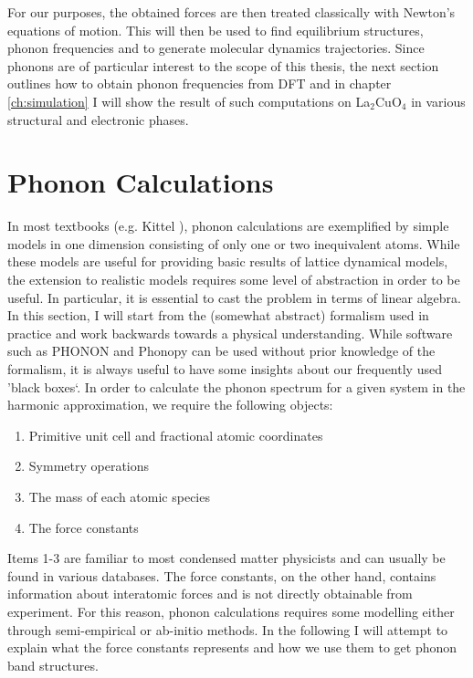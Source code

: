 For our purposes, the obtained forces are then treated classically with Newton's equations of motion. This will then be used to find equilibrium structures, phonon frequencies and to generate molecular dynamics trajectories. Since phonons are of particular interest to the scope of this thesis, the next section outlines how to obtain phonon frequencies from DFT and in chapter \ref{ch:simulation} I will show the result of such computations on La$_2$CuO$_4$ in various structural and electronic phases.

\section{Phonon Calculations}\label{sec:phonon_calc}
In most textbooks (e.g. Kittel \cite{Kittel2005}), phonon calculations are exemplified by simple models in one dimension consisting of only one or two inequivalent atoms. While these models are useful for providing basic results of lattice dynamical models, the extension to realistic models requires some level of abstraction in order to be useful. In particular, it is essential to cast the problem in terms of linear algebra. In this section, I will start from the (somewhat abstract) formalism used in practice and work backwards towards a physical understanding. While software such as PHONON \cite{Parlinski1997} and Phonopy \cite{Togo2015} can be used without prior knowledge of the formalism, it is always useful to have some insights about our frequently used 'black boxes`. In order to calculate the phonon spectrum for a given system in the harmonic approximation, we require the following objects:

\begin{enumerate}
	\item Primitive unit cell and fractional atomic coordinates
	\item Symmetry operations
	\item The mass of each atomic species
	\item The force constants
\end{enumerate}

Items 1-3 are familiar to most condensed matter physicists and can usually be found in various databases. The force constants, on the other hand, contains information about interatomic forces and is not directly obtainable from experiment. For this reason, phonon calculations requires some modelling either through semi-empirical or ab-initio methods. In the following I will attempt to explain what the force constants represents and how we use them to get phonon band structures.

